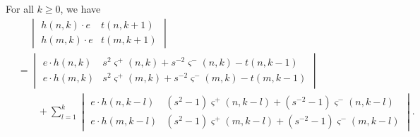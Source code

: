 \begin{lemma} \label{lemma:detgymnastics4}
For all $k \geq 0$, we have
\begin{align*}
&\quad \,
\begin{vmatrix}
h(n, k) \cdot e & t(n, k+1) \\
h(m, k) \cdot e & t(m, k+1)
\end{vmatrix} \\
&=
\begin{vmatrix}
e \cdot h(n, k) & s^2 \varsigma^+ (n, k) + s^{-2} \varsigma^- (n, k) - t(n, k-1) \\
e \cdot h(m, k) & s^2 \varsigma^+ (m, k) + s^{-2} \varsigma^- (m, k) - t(m, k-1)
\end{vmatrix}\\
& \qquad +
\sum_{l=1}^{k}
\begin{vmatrix}
e \cdot h(n, k-l) & (s^2 - 1) \varsigma^+ (n, k-l) + (s^{-2} - 1) \varsigma^- (n, k-l) \\
e \cdot h(m, k-l) & (s^2 - 1) \varsigma^+ (m, k-l) + (s^{-2} - 1) \varsigma^- (m, k-l)
\end{vmatrix}.
\end{align*} 
\end{lemma}
